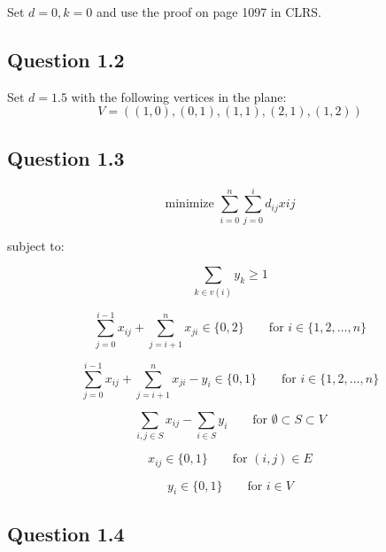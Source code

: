 \documentclass{sig-alternate}
\begin{document}
Set $d=0, k=0$ and use the proof on page 1097 in CLRS.

\subsection*{Question 1.2}

Set $d=1.5$ with the following vertices in the plane: \[ V=((1,0),(0,1),(1,1),(2,1),(1,2)) \]

\subsection*{Question 1.3}

\begin{equation}
    \text{minimize } \sum_{i=0}^{n}\sum_{j=0}^{i} d_{ij}x{ij}
\end{equation}

subject to:

\begin{equation}
    \sum_{k \in v(i)} y_k \geq 1
\end{equation}

\begin{equation}
    \sum_{j=0}^{i-1} x_{ij} + \sum_{j=i+1}^{n} x_{ji} \in \{0,2\} \qquad \text{for } i \in \{1,2,\ldots,n\}
\end{equation}

\begin{equation}
    \label{eqn:vertexdegree}
    \sum_{j=0}^{i-1} x_{ij} + \sum_{j=i+1}^{n} x_{ji} - y_i \in \{0,1\} \qquad \text{for } i \in \{1,2,\ldots,n\}
\end{equation}

\begin{equation}
    \label{eqn:nosubtour}
    \sum_{i,j \in S} x_{ij} - \sum_{i \in S} y_i \qquad \text{for } \emptyset \subset S \subset V
\end{equation}

\begin{equation}
    x_{ij} \in \{0,1\} \qquad\text{for } (i,j) \in E
\end{equation}

\begin{equation}
    y_{i} \in \{0,1\} \qquad\text{for } i \in V
\end{equation}

\subsection*{Question 1.4}
\end{document}
